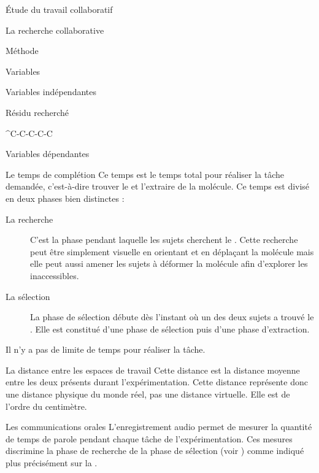 \documentclass[myfrancais]{mythesis}
\begin{document}
\begin{mypart}{Étude du travail collaboratif}
\begin{mychapter}{La recherche collaborative}
\begin{mysection}{Méthode}
\begin{mysubsection}{Variables}
\begin{mysubsubsection}{Variables indépendantes}
\begin{myparagraph}{ Résidu recherché}
\begin{mytable}
\begin{mytabular}{^C-C-C-C-C}
									\mybottomrule
								\end{mytabular}
							\end{mytable}
						\end{myparagraph}
					\end{mysubsubsection}
					\begin{mysubsubsection}{Variables dépendantes}
						\begin{myparagraph}{ Le temps de complétion}
							Ce temps est le temps total pour réaliser la tâche demandée, c'est-à-dire trouver le  et l'extraire de la molécule.
							Ce temps est divisé en deux phases bien distinctes :
							\begin{description}
								\item[La recherche] C'est la phase pendant laquelle les sujets cherchent le .
									Cette recherche peut être simplement visuelle en orientant et en déplaçant la molécule mais elle peut aussi amener les sujets à déformer la molécule afin d'explorer les  inaccessibles.
								\item[La sélection] La phase de sélection débute dès l'instant où un des deux sujets a trouvé le .
									Elle est constitué d'une phase de sélection puis d'une phase d'extraction.
							\end{description}
							Il n'y a pas de limite de temps pour réaliser la tâche.
						\end{myparagraph}
						\begin{myparagraph}{ La distance entre les espaces de travail}
							Cette distance est la distance moyenne entre les deux  présents durant l'expérimentation.
							Cette distance représente donc une distance physique du monde réel, pas une distance virtuelle.
							Elle est de l'ordre du centimètre.
						\end{myparagraph}
						\begin{myparagraph}{ Les communications orales}
							L'enregistrement audio permet de mesurer la quantité de temps de parole pendant chaque tâche de l'expérimentation.
							Ces mesures discrimine la phase de recherche de la phase de sélection (voir ) comme indiqué plus précisément sur la .


\end{myparagraph}
\end{mysubsubsection}
\end{mysubsection}
\end{mysection}
\end{mychapter}
\end{mypart}
\end{document}
